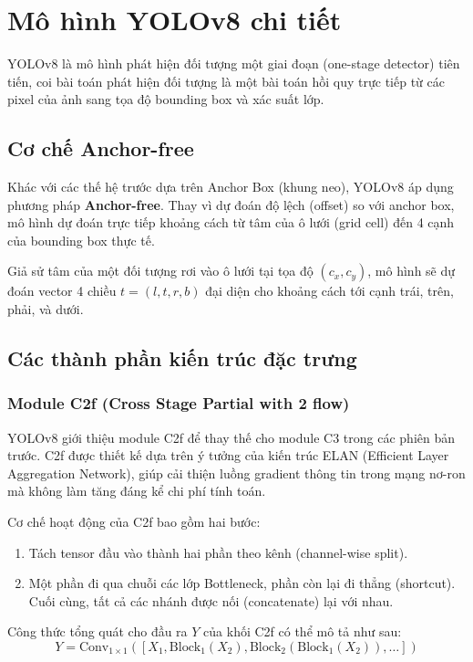 \section{Mô hình YOLOv8 chi tiết}
YOLOv8 là mô hình phát hiện đối tượng một giai đoạn (one-stage detector) tiên tiến, coi bài toán phát hiện đối tượng là một bài toán hồi quy trực tiếp từ các pixel của ảnh sang tọa độ bounding box và xác suất lớp.

\subsection{Cơ chế Anchor-free}
Khác với các thế hệ trước dựa trên Anchor Box (khung neo), YOLOv8 áp dụng phương pháp \textbf{Anchor-free}. Thay vì dự đoán độ lệch (offset) so với anchor box, mô hình dự đoán trực tiếp khoảng cách từ tâm của ô lưới (grid cell) đến 4 cạnh của bounding box thực tế.

Giả sử tâm của một đối tượng rơi vào ô lưới tại tọa độ $(c_x, c_y)$, mô hình sẽ dự đoán vector 4 chiều $t = (l, t, r, b)$ đại diện cho khoảng cách tới cạnh trái, trên, phải, và dưới.

\subsection{Các thành phần kiến trúc đặc trưng}

\subsubsection{Module C2f (Cross Stage Partial with 2 flow)}
YOLOv8 giới thiệu module C2f để thay thế cho module C3 trong các phiên bản trước. C2f được thiết kế dựa trên ý tưởng của kiến trúc ELAN (Efficient Layer Aggregation Network), giúp cải thiện luồng gradient thông tin trong mạng nơ-ron mà không làm tăng đáng kể chi phí tính toán.

Cơ chế hoạt động của C2f bao gồm hai bước:
\begin{enumerate}
    \item Tách tensor đầu vào thành hai phần theo kênh (channel-wise split).
    \item Một phần đi qua chuỗi các lớp Bottleneck, phần còn lại đi thẳng (shortcut). Cuối cùng, tất cả các nhánh được nối (concatenate) lại với nhau.
\end{enumerate}

Công thức tổng quát cho đầu ra $Y$ của khối C2f có thể mô tả như sau:
\begin{equation}
    Y = \text{Conv}_{1\times1}([X_1, \text{Block}_1(X_2), \text{Block}_2(\text{Block}_1(X_2)), \dots])
\end{equation}

